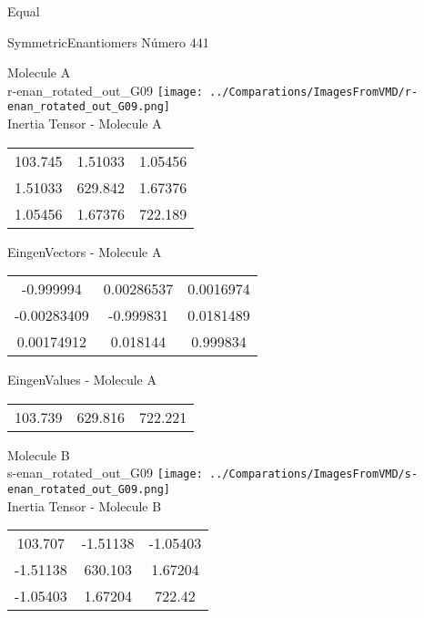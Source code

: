 \begin{center}
\vtab
\vtab
\textcolor{NavyBlue}{\Large Equal}
\end{center}

 \newpage

\vtab[-2cm]
\begin{center}
{\large SymmetricEnantiomers \tab Número 441}
\end{center}
\begin{multicols}{2}
\begin{center}

Molecule A \\ 
r-enan\_rotated\_out\_G09
\texttt{[image: ../Comparations/ImagesFromVMD/r-enan\_rotated\_out\_G09.png]}
\\
Inertia Tensor - Molecule A \\
\vtab

\begin{tabular}{|c c c|}
103.745	 & 	1.51033	 & 	1.05456	 \\
1.51033	 & 	629.842	 & 	1.67376	 \\
1.05456	 & 	1.67376	 & 	722.189
\end{tabular}

\vtab
 EingenVectors - Molecule A     \\
\vtab
\begin{tabular}{|c c c|}
-0.999994	 & 	0.00286537	 & 	0.0016974	 \\
-0.00283409	 & 	-0.999831	 & 	0.0181489	 \\
0.00174912	 & 	0.018144	 & 	0.999834
\end{tabular}

\vtab
 EingenValues - Molecule A     \\
\vtab
\begin{tabular}{|c c c|}
103.739	 & 	629.816	 & 	722.221	 \\
\end{tabular}
\columnbreak

Molecule B \\ 
s-enan\_rotated\_out\_G09
\texttt{[image: ../Comparations/ImagesFromVMD/s-enan\_rotated\_out\_G09.png]}
\\
Inertia Tensor - Molecule B \\
\vtab

\begin{tabular}{|c c c|}
103.707	 & 	-1.51138	 & 	-1.05403	 \\
-1.51138	 & 	630.103	 & 	1.67204	 \\
-1.05403	 & 	1.67204	 & 	722.42
\end{tabular}


\end{center}
\end{multicols}
